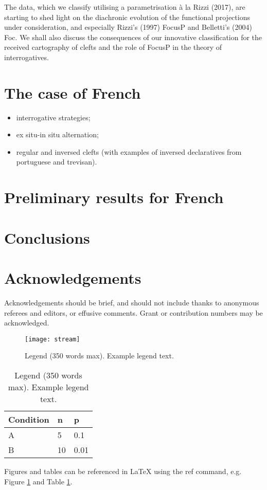 \documentclass[fleqn,10pt]{wlscirep}
\begin{document}
The data, which we classify utilising a parametrisation à la Rizzi (2017), are starting to shed light on the diachronic evolution of the functional projections under consideration, and especially Rizzi’s (1997) FocusP and Belletti’s (2004) Foc. We shall also discuss the consequences of our innovative classification for the received cartography of clefts and the role of FocusP in the theory of interrogatives. 

\section*{The case of French}
\begin{itemize}
    \item interrogative strategies;
    \item ex situ-in situ alternation;
    \item regular and inversed clefts (with examples of inversed declaratives from portuguese and trevisan).
    \end{itemize}

\section*{Preliminary results for French}



\section*{Conclusions}





\section*{Acknowledgements}

Acknowledgements should be brief, and should not include thanks to anonymous referees and editors, or effusive comments. Grant or contribution numbers may be acknowledged.

\begin{figure}[ht]
\centering
\texttt{[image: stream]}
\caption{Legend (350 words max). Example legend text.}
\label{fig:stream}
\end{figure}

\begin{table}[ht]
\centering
\begin{tabular}{|l|l|l|}
\hline
Condition & n & p \\
\hline
A & 5 & 0.1 \\
\hline
B & 10 & 0.01 \\
\hline
\end{tabular}
\caption{\label{tab:example}Legend (350 words max). Example legend text.}
\end{table}

Figures and tables can be referenced in LaTeX using the ref command, e.g. Figure \ref{fig:stream} and Table \ref{tab:example}.
\end{document}

